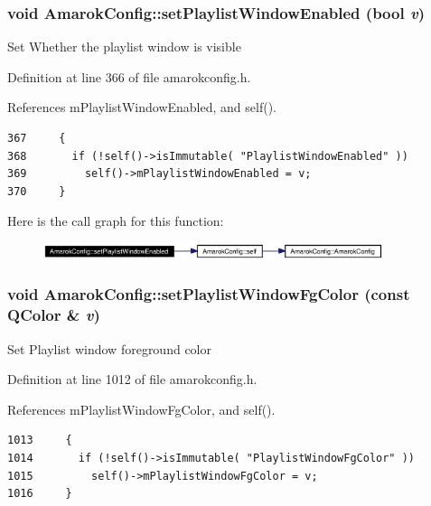 \subsubsection{\setlength{\rightskip}{0pt plus 5cm}void Amarok\-Config::set\-Playlist\-Window\-Enabled (bool {\em v})\hspace{0.3cm}{\tt  [inline, static]}}\label{classAmarokConfig_AmarokConfige37}


Set Whether the playlist window is visible 

Definition at line 366 of file amarokconfig.h.

References m\-Playlist\-Window\-Enabled, and self().



\footnotesize\begin{verbatim}367     {
368       if (!self()->isImmutable( "PlaylistWindowEnabled" ))
369         self()->mPlaylistWindowEnabled = v;
370     }
\end{verbatim}\normalsize 


Here is the call graph for this function:\begin{figure}[H]
\begin{center}
\leavevmode
\includegraphics[width=282pt]{classAmarokConfig_AmarokConfige37_cgraph}
\end{center}
\end{figure}
\subsubsection{\setlength{\rightskip}{0pt plus 5cm}void Amarok\-Config::set\-Playlist\-Window\-Fg\-Color (const QColor \& {\em v})\hspace{0.3cm}{\tt  [inline, static]}}\label{classAmarokConfig_AmarokConfige105}


Set Playlist window foreground color 

Definition at line 1012 of file amarokconfig.h.

References m\-Playlist\-Window\-Fg\-Color, and self().



\footnotesize\begin{verbatim}1013     {
1014       if (!self()->isImmutable( "PlaylistWindowFgColor" ))
1015         self()->mPlaylistWindowFgColor = v;
1016     }
\end{verbatim}\normalsize 


